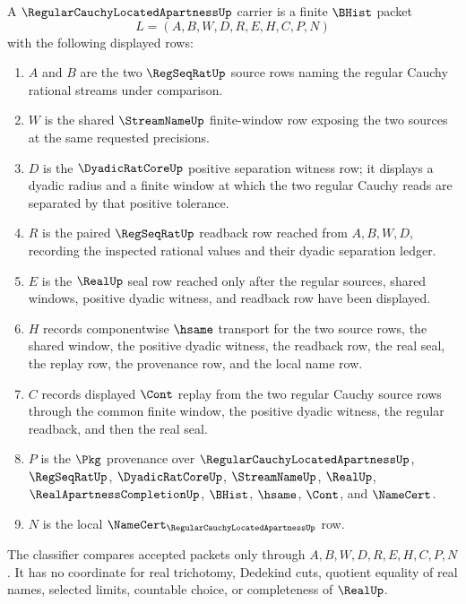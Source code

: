 \begin{definition}
\label{def:regular-cauchy-located-apartness-carrier}
A $\RegularCauchyLocatedApartnessUp$ carrier is a finite $\BHist$ packet
$$
L=(A,B,W,D,R,E,H,C,P,N)
$$
with the following displayed rows:
\begin{enumerate}
\item $A$ and $B$ are the two $\RegSeqRatUp$ source rows naming the regular Cauchy rational streams under comparison.
\item $W$ is the shared $\StreamNameUp$ finite-window row exposing the two sources at the same requested precisions.
\item $D$ is the $\DyadicRatCoreUp$ positive separation witness row; it displays a dyadic radius and a finite window at which the two regular Cauchy reads are separated by that positive tolerance.
\item $R$ is the paired $\RegSeqRatUp$ readback row reached from $A,B,W,D$, recording the inspected rational values and their dyadic separation ledger.
\item $E$ is the $\RealUp$ seal row reached only after the regular sources, shared windows, positive dyadic witness, and readback row have been displayed.
\item $H$ records componentwise $\hsame$ transport for the two source rows, the shared window, the positive dyadic witness, the readback row, the real seal, the replay row, the provenance row, and the local name row.
\item $C$ records displayed $\Cont$ replay from the two regular Cauchy source rows through the common finite window, the positive dyadic witness, the regular readback, and then the real seal.
\item $P$ is the $\Pkg$ provenance over $\RegularCauchyLocatedApartnessUp$, $\RegSeqRatUp$, $\DyadicRatCoreUp$, $\StreamNameUp$, $\RealUp$, $\RealApartnessCompletionUp$, $\BHist$, $\hsame$, $\Cont$, and $\NameCert$.
\item $N$ is the local $\NameCert_{\RegularCauchyLocatedApartnessUp}$ row.
\end{enumerate}
The classifier compares accepted packets only through $A,B,W,D,R,E,H,C,P,N$. It has no coordinate for real trichotomy, Dedekind cuts, quotient equality of real names, selected limits, countable choice, or completeness of $\RealUp$.
\end{definition}

